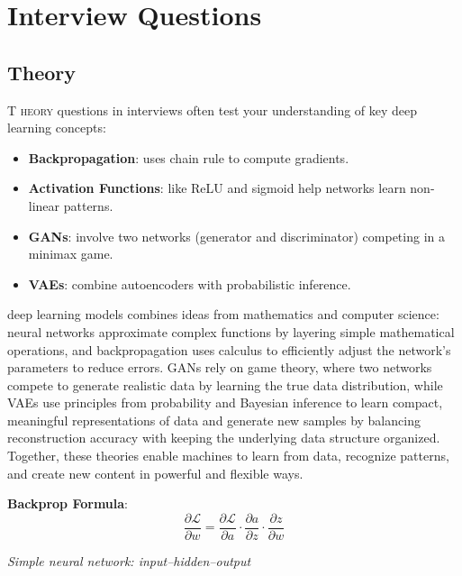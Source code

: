 \documentclass{book}
\begin{document}
\chapter{Interview Questions}

\section{Theory}
\lettrine{T}{ heory} questions in interviews often test your understanding of key deep learning concepts:

\begin{itemize}
  \item \textbf{Backpropagation}: uses chain rule to compute gradients.
  \item \textbf{Activation Functions}: like ReLU and sigmoid help networks learn non-linear patterns.
  \item \textbf{GANs}: involve two networks (generator and discriminator) competing in a minimax game.
  \item \textbf{VAEs}: combine autoencoders with probabilistic inference.
\end{itemize}

deep learning models combines ideas from mathematics and computer science: neural networks approximate complex functions by layering simple mathematical operations, and backpropagation uses calculus to efficiently adjust the network’s parameters to reduce errors. GANs rely on game theory, where two networks compete to generate realistic data by learning the true data distribution, while VAEs use principles from probability and Bayesian inference to learn compact, meaningful representations of data and generate new samples by balancing reconstruction accuracy with keeping the underlying data structure organized. Together, these theories enable machines to learn from data, recognize patterns, and create new content in powerful and flexible ways.

\vspace{0.3cm}
\noindent\textbf{Backprop Formula}:
\[
\frac{\partial \mathcal{L}}{\partial w} = \frac{\partial \mathcal{L}}{\partial a} \cdot \frac{\partial a}{\partial z} \cdot \frac{\partial z}{\partial w}
\]

\vspace{0.4cm}
\begin{center}

\smallskip
\textit{Simple neural network: input–hidden–output}
\end{center}
\end{document}
